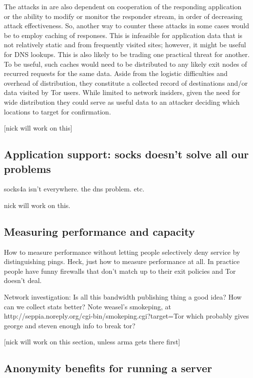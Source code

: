 \documentclass{llncs}
\begin{document}
The attacks in \cite{attack-tor-oak05} are also dependent on
cooperation of the responding application or the ability to modify or
monitor the responder stream, in order of decreasing attack
effectiveness.  So, another way to counter these attacks in some cases
would be to employ caching of responses. This is infeasible for
application data that is not relatively static and from frequently
visited sites; however, it might be useful for DNS lookups. This is
also likely to be trading one practical threat for another. To be
useful, such caches would need to be distributed to any likely exit
nodes of recurred requests for the same data.  Aside from the logistic
difficulties and overhead of distribution, they constitute a collected
record of destinations and/or data visited by Tor users.  While
limited to network insiders, given the need for wide distribution
they could serve as useful data to an attacker deciding which locations
to target for confirmation.

[nick will work on this]

\subsection{Application support: socks doesn't solve all our problems}

socks4a isn't everywhere. the dns problem. etc.

nick will work on this.

\subsection{Measuring performance and capacity}

How to measure performance without letting people selectively deny service
by distinguishing pings. Heck, just how to measure performance at all. In
practice people have funny firewalls that don't match up to their exit
policies and Tor doesn't deal.

Network investigation: Is all this bandwidth publishing thing a good idea?
How can we collect stats better? Note weasel's smokeping, at
http://seppia.noreply.org/cgi-bin/smokeping.cgi?target=Tor
which probably gives george and steven enough info to break tor?

[nick will work on this section, unless arma gets there first]

\subsection{Anonymity benefits for running a server}
\end{document}
